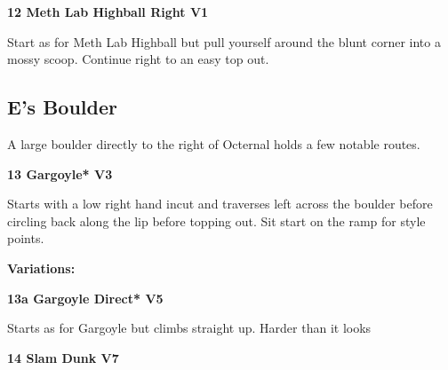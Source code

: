 \begin{multicols}{2}
			
			\needspace{1.5cm}
\label{rt:Meth Lab Highball Right}
\colorbox{green!20}{
\parbox{0.95\linewidth}{
\textbf{
12 Meth Lab Highball Right V1  
}}}

			\begin{adjustwidth}{0.5cm}{}			
			Start as for Meth Lab Highball but pull yourself around the blunt corner into a mossy scoop. Continue right to an easy top out.
			\end{adjustwidth}
			
			
		


		\needspace{1.5cm}
		\subsection*{E's Boulder}\label{bf:E's Boulder}
		A large boulder directly to the right of Octernal holds a few notable routes.\\
	
		
			
			\needspace{1.5cm}
\label{rt:Gargoyle}
\colorbox{green!20}{
\parbox{0.95\linewidth}{
\textbf{
13 Gargoyle* V3  
}}}

			\begin{adjustwidth}{0.5cm}{}			
			Starts with a low right hand incut and traverses left across the boulder before circling back along the lip before topping out. Sit start on the ramp for style points.
			\end{adjustwidth}
			
				\begin{adjustwidth}{0.5cm}{}				
				\needspace{3cm}
				\textbf{Variations:} \newline
					
					\needspace{1.5cm}
\label{vr:Gargoyle Direct}
\colorbox{RoyalBlue!20}{
\parbox{0.95\linewidth}{
\textbf{
13a Gargoyle Direct* V5  
}}}

					\begin{adjustwidth}{0.5cm}{}			
					Starts as for Gargoyle but climbs straight up. Harder than it looks
					\end{adjustwidth}
					
					
				\end{adjustwidth}
			


			\needspace{1.5cm}
\label{rt:Slam Dunk}
\colorbox{Goldenrod!50}{
\parbox{0.95\linewidth}{
\textbf{
14 Slam Dunk V7  
}}}


\end{multicols}
